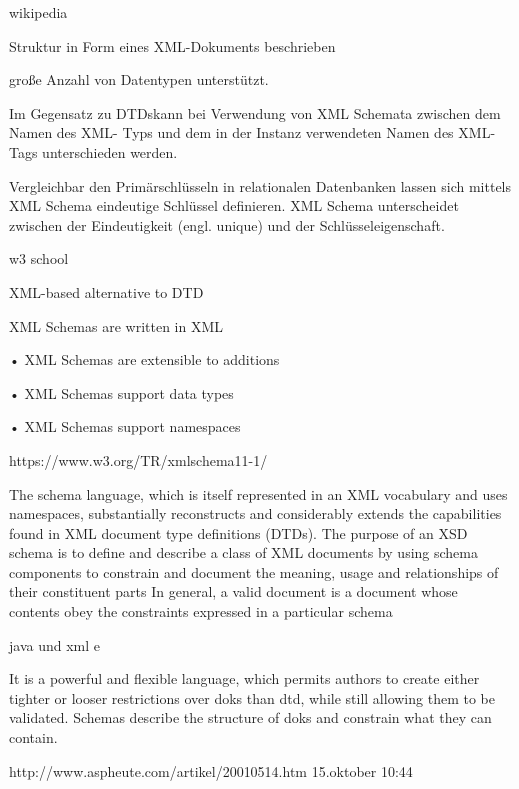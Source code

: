 
wikipedia

Struktur in Form eines XML-Dokuments beschrieben

große Anzahl von Datentypen unterstützt.

Im Gegensatz zu DTDskann bei Verwendung von XML Schemata zwischen dem Namen des XML- Typs und dem in der Instanz verwendeten Namen des XML-Tags unterschieden werden.

Vergleichbar den Primärschlüsseln in relationalen Datenbanken lassen sich mittels XML Schema eindeutige Schlüssel definieren. XML Schema unterscheidet zwischen der Eindeutigkeit (engl. unique) und der Schlüsseleigenschaft.


w3 school

XML-based alternative to DTD

XML Schemas are written in XML

• XML Schemas are extensible to additions

• XML Schemas support data types

• XML Schemas support namespaces


https://www.w3.org/TR/xmlschema11-1/

The schema language, which is itself represented in an XML vocabulary and uses namespaces, substantially reconstructs and considerably extends the capabilities found in XML document type definitions (DTDs). The purpose of an XSD schema is to define and describe a class of XML documents by using schema components to constrain and document the meaning, usage and relationships of their constituent parts In general, a valid document is a document whose contents obey the constraints expressed in a particular schema


java und xml e

It is a powerful and flexible language, which permits authors to create either tighter or looser restrictions over doks than dtd, while still allowing them to be validated. Schemas describe the structure of doks and constrain what they can contain.


http://www.aspheute.com/artikel/20010514.htm 15.oktober 10:44

